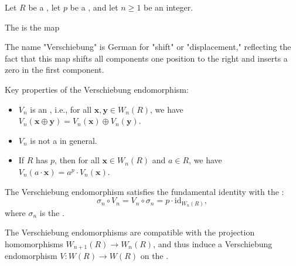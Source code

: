 \begin{definition}\label{definition:verschiebung_endomorphism_on_truncated_witt_vectors_of_length_n_over_a_commutative_ring}
Let $R$ be a , let $p$ be a , and let $n \geq 1$ be an integer.

The  is the map

The name "Verschiebung" is German for "shift" or "displacement," reflecting the fact that this map shifts all components one position to the right and inserts a zero in the first component.

Key properties of the Verschiebung endomorphism:
\begin{itemize}
    \item $V_n$ is an , i.e., for all $\mathbf{x}, \mathbf{y} \in W_n(R)$, we have $V_n(\mathbf{x} \oplus \mathbf{y}) = V_n(\mathbf{x}) \oplus V_n(\mathbf{y})$.
    \item $V_n$ is not a  in general.
    \item If $R$ has  $p$, then for all $\mathbf{x} \in W_n(R)$ and $a \in R$, we have $V_n(a \cdot \mathbf{x}) = a^p \cdot V_n(\mathbf{x})$.
\end{itemize}

The Verschiebung endomorphism satisfies the fundamental identity with the :
$$
    \sigma_n \circ V_n = V_n \circ \sigma_n = p \cdot \mathrm{id}_{W_n(R)},
$$
where $\sigma_n$ is the .

The Verschiebung endomorphisms are compatible with the projection homomorphisms $W_{n+1}(R) \to W_n(R)$, and thus induce a Verschiebung endomorphism $V: W(R) \to W(R)$ on the .
\end{definition}
